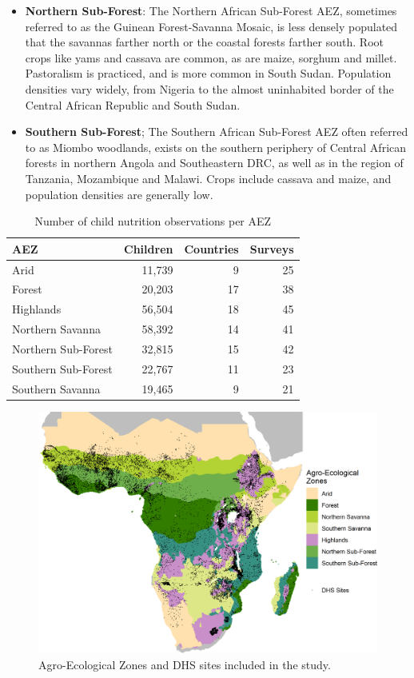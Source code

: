 \documentclass{article}
\begin{document}
\begin{itemize}
	\item \textbf{Northern Sub-Forest}:  The Northern African Sub-Forest AEZ, sometimes referred to as the Guinean Forest-Savanna Mosaic, is less densely populated that the savannas farther north or the coastal forests farther south.  Root crops like yams and cassava are common, as are maize, sorghum and millet.  Pastoralism is practiced, and is more common in South Sudan.  Population densities vary widely, from Nigeria to the almost uninhabited border of the Central African Republic and South Sudan.
	\item \textbf{Southern Sub-Forest};  The Southern African Sub-Forest AEZ often referred to as Miombo woodlands, exists on the southern periphery of Central African forests in northern Angola and Southeastern DRC, as well as in the region of Tanzania, Mozambique and Malawi.  Crops include cassava and maize, and population densities are generally low.
\end{itemize}

\begin{table}[h]
	\begin{center}
	\begin{tabular}{l | r | r | r}
		AEZ & Children & Countries & Surveys \\
		\hline
		Arid & 11,739 & 9 & 25\\
		Forest & 20,203 & 17 & 38 \\
		Highlands & 56,504 & 18 & 45 \\
		Northern Savanna & 58,392 & 14 & 41 \\
		Northern Sub-Forest & 32,815 & 15 & 42 \\
		Southern Sub-Forest & 22,767 & 11 & 23 \\
		Southern Savanna & 19,465 & 9 & 21 \\
	\end{tabular}
\caption{Number of child nutrition observations per AEZ}
\label{table:AEZtab}
\end{center}
\end{table}

\begin{figure}[h]
	\centering
	\includegraphics[width=0.8\linewidth]{AEZ_Sites.png}
	\caption{Agro-Ecological Zones and DHS sites included in the study.}
	\label{fig:AEZmap}
\end{figure}
\end{document}
